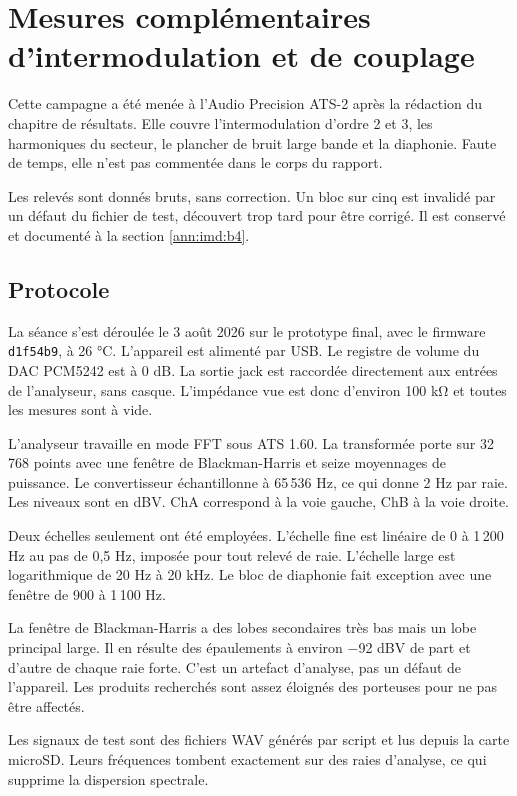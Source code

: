\chapter{Mesures complémentaires d'intermodulation et de couplage}
\label{ann:imd}

Cette campagne a été menée à l'Audio Precision ATS-2 après la rédaction du chapitre de résultats. Elle couvre l'intermodulation d'ordre 2 et 3, les harmoniques du secteur, le plancher de bruit large bande et la \gls{diaphonie}. Faute de temps, elle n'est pas commentée dans le corps du rapport.

Les relevés sont donnés bruts, sans correction. Un bloc sur cinq est invalidé par un défaut du fichier de test, découvert trop tard pour être corrigé. Il est conservé et documenté à la section \ref{ann:imd:b4}.

\section{Protocole}
\label{ann:imd:protocole}

La séance s'est déroulée le 3 août 2026 sur le prototype final, avec le firmware \texttt{d1f54b9}, à 26 °C. L'appareil est alimenté par USB. Le registre de volume du \gls{DAC} PCM5242 est à 0 dB. La sortie jack est raccordée directement aux entrées de l'analyseur, sans casque. L'impédance vue est donc d'environ 100 kΩ et toutes les mesures sont à vide.

L'analyseur travaille en mode FFT sous ATS 1.60. La transformée porte sur 32\,768 points avec une fenêtre de Blackman-Harris et seize moyennages de puissance. Le convertisseur échantillonne à 65\,536 Hz, ce qui donne 2 Hz par raie. Les niveaux sont en dBV. ChA correspond à la voie gauche, ChB à la voie droite.

Deux échelles seulement ont été employées. L'échelle fine est linéaire de 0 à 1\,200 Hz au pas de 0,5 Hz, imposée pour tout relevé de raie. L'échelle large est logarithmique de 20 Hz à 20 kHz. Le bloc de \gls{diaphonie} fait exception avec une fenêtre de 900 à 1\,100 Hz.

La fenêtre de Blackman-Harris a des lobes secondaires très bas mais un lobe principal large. Il en résulte des épaulements à environ $-$92 dBV de part et d'autre de chaque raie forte. C'est un artefact d'analyse, pas un défaut de l'appareil. Les produits recherchés sont assez éloignés des porteuses pour ne pas être affectés.

Les signaux de test sont des fichiers WAV générés par script et lus depuis la carte microSD. Leurs fréquences tombent exactement sur des raies d'analyse, ce qui supprime la dispersion spectrale.

